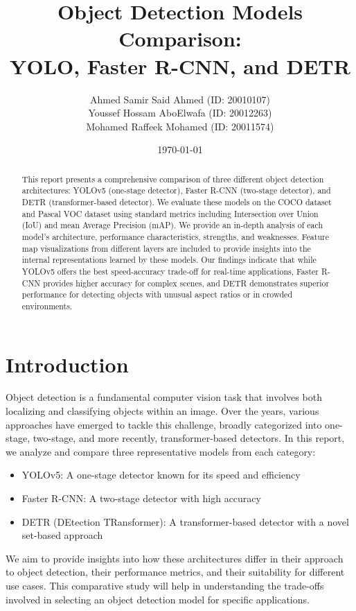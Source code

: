 \documentclass[12pt,a4paper]{article}
\title{\textbf{Object Detection Models Comparison:\\YOLO, Faster R-CNN, and DETR}}
\author{Ahmed Samir Said Ahmed (ID: 20010107)\\
        Youssef Hossam AboElwafa (ID: 20012263)\\
        Mohamed Raffeek Mohamed (ID: 20011574)}
\date{\today}
\begin{document}
\maketitle

\begin{abstract}
This report presents a comprehensive comparison of three different object detection architectures: YOLOv5 (one-stage detector), Faster R-CNN (two-stage detector), and DETR (transformer-based detector). 
We evaluate these models on the COCO dataset and Pascal VOC dataset using standard metrics including Intersection over Union (IoU) and mean Average Precision (mAP).
We provide an in-depth analysis of each model's architecture, performance characteristics, strengths, and weaknesses.
Feature map visualizations from different layers are included to provide insights into the internal representations learned by these models.
Our findings indicate that while YOLOv5 offers the best speed-accuracy trade-off for real-time applications, Faster R-CNN provides higher accuracy for complex scenes,
and DETR demonstrates superior performance for detecting objects with unusual aspect ratios or in crowded environments.
\end{abstract}

\tableofcontents
\newpage

\section{Introduction}
Object detection is a fundamental computer vision task that involves both localizing and classifying objects within an image.
Over the years, various approaches have emerged to tackle this challenge, broadly categorized into one-stage, two-stage, and more recently, transformer-based detectors.
In this report, we analyze and compare three representative models from each category:

\begin{itemize}
    \item YOLOv5: A one-stage detector known for its speed and efficiency
    \item Faster R-CNN: A two-stage detector with high accuracy
    \item DETR (DEtection TRansformer): A transformer-based detector with a novel set-based approach
\end{itemize}

We aim to provide insights into how these architectures differ in their approach to object detection, their performance metrics, and their suitability for different use cases.
This comparative study will help in understanding the trade-offs involved in selecting an object detection model for specific applications.
\end{document}
